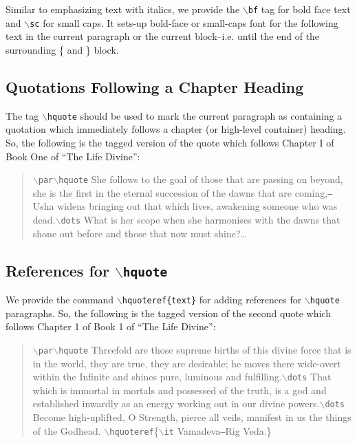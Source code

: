 \documentclass[11pt]{article}
\newcommand{\cmd}[1]{{\tt $\backslash$#1}}
\begin{document}
Similar to emphasizing text with italics, we provide the \cmd{bf} tag
for bold face text and \cmd{sc} for small caps.  It sets-up bold-face
or small-caps font for the following text in the current paragraph or
the current block--i.e. until the end of the surrounding \{ and \}
block.


\subsection{Quotations Following a Chapter Heading}

The tag \cmd{hquote} should be used to mark the current paragraph as
containing a quotation which immediately follows a chapter (or
high-level container) heading. So, the following is the tagged version
of the quote which follows Chapter I of Book One of ``The Life Divine'':

\begin{quote}
  \cmd{par}\cmd{hquote} She follows to the goal of those that are
  passing on beyond, she is the first in the eternal succession of the
  dawns that are coming,{\tt ---}Usha widens bringing out that which lives,
  awakening someone who was dead.\cmd{dots} What is her scope when she
  harmonises with the dawns that shone out before and those that now
  must shine?\ldots
\end{quote}



\subsection{References for \cmd{hquote}}

We provide the command \cmd{hquoteref\{text\}} for adding references
for \cmd{hquote} paragraphs. So, the following is the tagged version
of the second quote which follows Chapter 1 of Book 1 of ``The Life
Divine'':

\begin{quote}
  \cmd{par}\cmd{hquote} Threefold are those supreme births of this
  divine force that is in the world, they are true, they are
  desirable; he moves there wide-overt within the Infinite and shines
  pure, luminous and fulfilling.\cmd{dots} That which is immortal in
  mortals and possessed of the truth, is a god and established
  inwardly as an energy working out in our divine powers.\cmd{dots}
  Become high-uplifted, O Strength, pierce all veils, manifest in us
  the things of the Godhead.
  \cmd{hquoteref}\{\cmd{it} Vamadeva{\tt ---}Rig Veda.\}
\end{quote}
\end{document}
